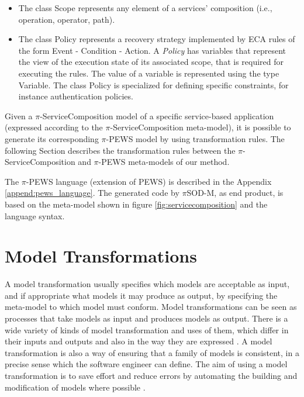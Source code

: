 \begin{itemize}
\item The class {\sc Scope} represents any element of a services' composition (i.e., operation, operator, path).
\item The class {\sc Policy} represents a recovery strategy implemented by ECA
rules of the form {\sc Event} - {\sc Condition} - {\sc Action}. A {\em Policy}
has variables that represent the view of the execution state of its associated
scope, that is required for executing the rules. The value of a variable is
represented using the type {\sc Variable}. The class {\sc Policy} is specialized
for defining specific constraints, for instance authentication policies.
\end{itemize}

Given a $\pi$-ServiceComposition model of a specific service-based application
(expressed according to the $\pi$-ServiceComposition meta-model), it is possible
to generate its corresponding $\pi$-PEWS model by using transformation
rules. The following Section describes the transformation rules between the
$\pi$-ServiceComposition and $\pi$-PEWS meta-models of our method.

The $\pi$-PEWS language (extension of PEWS) is described in the Appendix
\ref{append:pews_language}. The generated code by $\pi$SOD-M, as end product, is
based on the meta-model shown in figure \ref{fig:servicecomposition} and the
language syntax.
 

\section{Model Transformations}
\label{sec:models-tranformation}

A model transformation usually specifies which models are acceptable as input,
and if appropriate what models it may produce as output, by specifying the
meta-model to which model must conform. Model transformations can be seen
as processes that take models as input and produces models as output. There
is a wide variety of kinds of model transformation and uses of them, which differ in their inputs and outputs
and also in the way they are expressed \cite{miller}. A model transformation is
also a way of ensuring that a family of models is consistent, in a precise sense
which the software engineer can define. The aim of using a model transformation
is to save effort and reduce errors by automating the building and modification
of models where possible \cite{atl_manual}.

